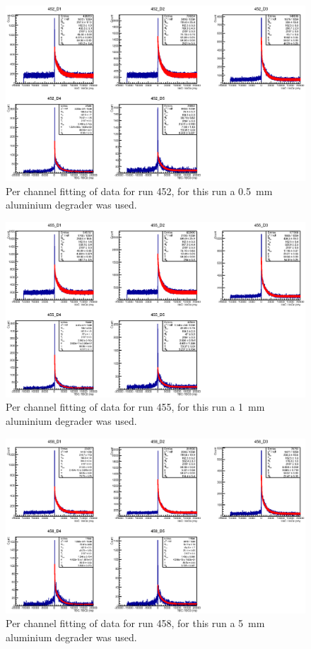 %
\begin{figure}
    \centering
      \includegraphics[scale=1]{images/momentum_spectrum/452.eps}
    \caption{Per channel fitting of data for run 452, for this run a 0.5~mm aluminium degrader was used.}
    \label{fig:images_momentum_spectrum_452}
\end{figure}
%
\begin{figure}
    \centering
      \includegraphics[scale=1]{images/momentum_spectrum/455.eps}
    \caption{Per channel fitting of data for run 455, for this run a 1~mm aluminium degrader was used.}
    \label{fig:images_momentum_spectrum_455}
\end{figure}
%
\begin{figure}
    \centering
      \includegraphics[scale=1]{images/momentum_spectrum/458.eps}
    \caption{Per channel fitting of data for run 458, for this run a 5~mm aluminium degrader was used.}
    \label{fig:images_momentum_spectrum_458}
\end{figure}
